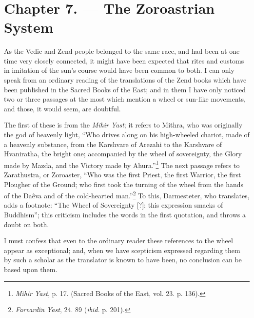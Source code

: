 \documentclass[a4paper, 11pt, oneside, polutonikogreek, english]{article}
\begin{document}
\section{Chapter 7. --- The Zoroastrian System}
\paragraph{}
As the Vedic and Zend people belonged to the same race, and had been at one time very closely connected, it might have been expected that rites and customs in imitation of the sun's course would have been common to both. I can only speak from an ordinary reading of the translations of the Zend books which have been published in the Sacred Books of the East; and in them I have only noticed two or three passages at the most which mention a wheel or sun-like movements, and those, it would seem, are doubtful.

The first of these is from the \emph{Mihir Yast}; it refers to Mithra, who was originally the god of heavenly light, ``Who drives along on his high-wheeled chariot, made of a heavenly substance, from the Karshvare of Arezahi to the Karshvare of Hvaniratha, the bright one; accompanied by the wheel of sovereignty, the Glory made by Mazda, and the Victory made by Ahura.''\footnote{\emph{Mihir Yast}, p. 17. (Sacred Books of the East, vol. 23. p. 136).} The next passage refers to Zarathustra, or Zoroaster, ``Who was the first Priest, the first Warrior, the first Plougher of the Ground; who first took the turning of the wheel from the hands of the Daêva and of the cold-hearted man.''\footnote{\emph{Farvardîn Yast}, 24. 89 (\emph{ibid.} p. 201).} To this, Darmesteter, who translates, adds a footnote: ``The Wheel of Sovereignty [?]: this expression smacks of Buddhism''; this criticism includes the words in the first quotation, and throws a doubt on both.

I must confess that even to the ordinary reader these references to the wheel appear as exceptional; and, when we have scepticism expressed regarding them by such a scholar as the translator is known to have been, no conclusion can be based upon them.
\end{document}
